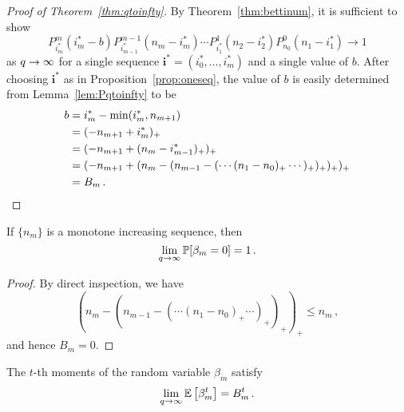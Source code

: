 \begin{proof}[Proof of Theorem~\ref{thm:qtoinfty}]
  By Theorem~\ref{thm:bettinum}, it is sufficient to show
  \[
    P^m_{i_m^\ast}(i_m^\ast-b) P_{i^\ast_{m-1}}^{m-1}\left(n_{m} -i_m^\ast\right) \cdots
    P_{i_1^\ast}^1\left(n_2 - i_2^\ast\right) P_{n_0}^0 \left(n_1 - i_1^\ast\right) \to 1 
  \]
  as $q \rightarrow \infty$ for a single sequence $\mathbf{i}^\ast=(i_0^\ast, \ldots,
  i_m^\ast)$ and a single
  value of $b$. After choosing $\mathbf{i}^\ast$ as in Proposition~\ref{prop:oneseq},
  the value of $b$ is easily determined from Lemma~\ref{lem:Pqtoinfty} to be
	\begin{align*}
	b 	&= i_m^\ast - \min(i_m^\ast, n_{m+1})\\
		&= (-n_{m+1} + i_m^\ast)_+\\
		&= (-n_{m+1} + (n_m -i_{m-1}^\ast)_+)_+\\
		&= (-n_{m+1} + (n_m - (n_{m-1} - (\cdots (n_1 - n_0)_+ \cdots)_+)_+)_+ )_+\\
        &= B_m \, . \qedhere
	\end{align*}
\end{proof}


\begin{corollary}
  \label{cor:inc}
  If $\{n_m\}$ is a monotone increasing sequence, then 
  \[
    \lim_{q \rightarrow \infty} \mathbb{P}[\beta_m = 0] = 1 \, .
  \]
\end{corollary}

\begin{proof}
  By direct inspection, we have
  \[
    (n_m - (n_{m-1} - ( \cdots (n_1 - n_0)_+ \cdots )_+)_+)_+ \leq n_m \, ,
  \]
  and hence $B_m = 0$.
\end{proof}

\begin{corollary}
  The $t$-th moments of the random variable $\beta_m$ satisfy
  \[
    \lim_{q \rightarrow \infty} \mathbb{E}\left[\beta_m^t \right] = B_m^t \, .
  \]
\end{corollary}


